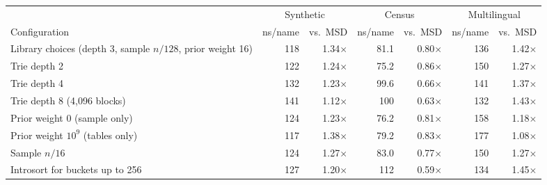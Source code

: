 \begin{tabular}{lrrrrrr}
\toprule
 & \multicolumn{2}{c}{Synthetic} & \multicolumn{2}{c}{Census} & \multicolumn{2}{c}{Multilingual}\\
\cmidrule(lr){2-3} \cmidrule(lr){4-5} \cmidrule(lr){6-7}
Configuration & ns/name & vs.\ MSD & ns/name & vs.\ MSD & ns/name & vs.\ MSD\\
\midrule
Library choices (depth 3, sample $n/128$, prior weight 16) & 118 & 1.34$\times$ & 81.1 & 0.80$\times$ & 136 & 1.42$\times$\\
\midrule
Trie depth 2 & 122 & 1.24$\times$ & 75.2 & 0.86$\times$ & 150 & 1.27$\times$\\
Trie depth 4 & 132 & 1.23$\times$ & 99.6 & 0.66$\times$ & 141 & 1.37$\times$\\
Trie depth 8 (4{,}096 blocks) & 141 & 1.12$\times$ & 100 & 0.63$\times$ & 132 & 1.43$\times$\\
Prior weight 0 (sample only) & 124 & 1.23$\times$ & 76.2 & 0.81$\times$ & 158 & 1.18$\times$\\
Prior weight $10^9$ (tables only) & 117 & 1.38$\times$ & 79.2 & 0.83$\times$ & 177 & 1.08$\times$\\
Sample $n/16$ & 124 & 1.27$\times$ & 83.0 & 0.77$\times$ & 150 & 1.27$\times$\\
Introsort for buckets up to 256 & 127 & 1.20$\times$ & 112 & 0.59$\times$ & 134 & 1.45$\times$\\
\bottomrule
\end{tabular}
